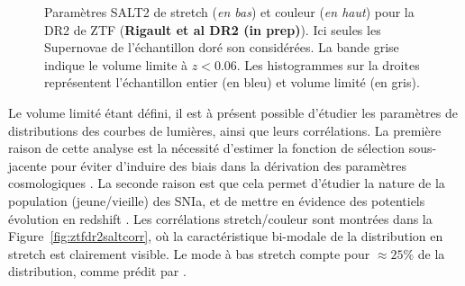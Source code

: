\documentclass[../main/main.tex]{subfiles}
\begin{document}
\begin{figure}[ht]
  \centering
  \caption[Paramètres SALT2 de stretch et couleur pour la DR2 de
  ZTF]{Paramètres SALT2 de stretch (\textit{en bas}) et couleur
    (\textit{en haut}) pour la DR2 de ZTF (\textbf{Rigault et al DR2 (in prep)}). Ici seules les Supernovae de
    l'échantillon doré son considérées. La bande grise indique le
    volume limite à $z<0.06$. Les histogrammes sur la droites
    représentent l'échantillon entier (en bleu) et volume limité (en gris).}
  \label{fig:ztfdr2salt}
\end{figure}

Le volume limité étant défini, il est à présent possible d'étudier les
paramètres de distributions des courbes de lumières, ainsi que leurs
corrélations. La première raison de cette analyse est la nécessité
d'estimer la fonction de sélection sous-jacente pour éviter d'induire
des biais dans la dérivation des
paramètres cosmologiques \citep{Scolnicbias2016}. La seconde raison est
que cela permet d'étudier la nature de la population (jeune/vieille) des
SNIa, et de mettre en évidence des potentiels évolution en redshift
\citep{NoraNicolas21}. Les corrélations stretch/couleur sont montrées
dans la Figure~\ref{fig:ztfdr2saltcorr}, où la caractéristique bi-modale
de la distribution en stretch est clairement visible. Le mode à bas
stretch compte pour $\approx25\%$ de la distribution, comme prédit par \citet{NoraNicolas21}.
\end{document}
